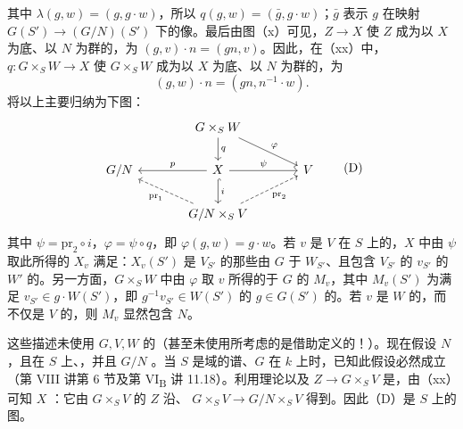 其中 $\lambda(g,w)=(g,g\cdot w)$，所以 $q(g,w)=(\bar g,g\cdot w)$；$\bar g$ 表示 $g$ 在映射 $G(S')\to(G/N)(S')$ 下的像。最后由图（x）可见，$Z\to X$ 使 $Z$ 成为以 $X$ 为底、以 $N$ 为群的，为 $(g,v)\cdot n=(gn,v)$。因此，在（xx）中，$q:G\times_S W\to X$ 使 $G\times_S W$ 成为以 $X$ 为底、以 $N$ 为群的，为
\[(g,w)\cdot n=(gn,n^{-1}\cdot w).\]
将以上主要归纳为下图：
\[
\begin{tikzcd}[column sep=large]
&G\times_S W\arrow[d,"q"]\arrow[dr,"\varphi"]&\\
G/N&X\arrow[l,"p"']\arrow[r,"\psi"]\arrow[d,hook,"i"]&V\\
&G/N\times_S V\arrow[ul,dashed,"\mathrm{pr}_1"]\arrow[ur,dashed,"\mathrm{pr}_2"']&
\end{tikzcd}\tag{D}
\]
其中 $\psi=\mathrm{pr}_2\circ i$，$\varphi=\psi\circ q$，即 $\varphi(g,w)=g\cdot w$。若 $v$ 是 $V$ 在 $S$ 上的，$X$ 中由 $\psi$ 取此所得的 $X_v$ 满足：$X_v(S')$ 是 $V_{S'}$ 的那些由 $G$ 于 $W_{S'}$、且包含 $V_{S'}$ 的 $v_{S'}$ 的 $W'$ 的。另一方面，$G\times_S W$ 中由 $\varphi$ 取 $v$ 所得的于 $G$ 的 $M_v$，其中 $M_v(S')$ 为满足 $v_{S'}\in g\cdot W(S')$，即 $g^{-1}v_{S'}\in W(S')$ 的 $g\in G(S')$ 的。若 $v$ 是 $W$ 的，而不仅是 $V$ 的，则 $M_v$ 显然包含 $N$。

这些描述未使用 $G,V,W$ 的（甚至未使用所考虑的是借助定义的！）。现在假设 $N$ ，且在 $S$ 上、，并且 $G/N$ 。当 $S$ 是域的谱、$G$ 在 $k$ 上时，已知此假设必然成立（第 VIII 讲第 6 节及第 VI\textsubscript{B} 讲 11.18）。利用理论以及 $Z\to G\times_S V$ 是，由（xx）可知 $X$ ：它由 $G\times_S V$ 的 $Z$ 沿、 $G\times_S V\to G/N\times_S V$ 得到。因此（D）是 $S$ 上的图。


